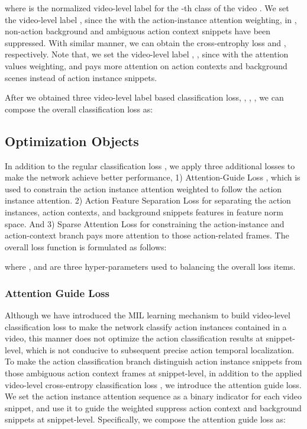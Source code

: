 \documentclass[journal,comsoc]{IEEEtran}
\begin{document}
where  is the normalized video-level label for the -th class of the video . We set the video-level label , since the with the action-instance attention weighting, in ,  non-action background and ambiguous action context snippets have been suppressed. With similar manner, we can obtain the cross-entrophy loss  and , respectively. Note that, we set the video-level label , , since with the attention values weighting,  and  pays more attention on action contexts and background scenes instead of action instance snippets. 

\par After we obtained three video-level label based classification loss, ,  ,  , we can compose the overall classification loss  as:




\subsection{Optimization Objects}
\label{sec:add_loss}

\par In addition to the regular classification loss , we apply three additional losses to make the network achieve better performance, 1) Attention-Guide Loss , which is used to constrain the action instance attention weighted  to follow the action instance attention. 2) Action Feature Separation Loss  for separating the action instances, action contexts, and background snippets features in feature norm space. And 3) Sparse Attention Loss  for constraining the action-instance and action-context branch pays more attention to those action-related frames. The overall loss function is formulated as follows:

where ,  and  are three hyper-parameters used to balancing the overall loss items.
\subsubsection{Attention Guide Loss} 
\par Although we have introduced the MIL learning mechanism to build video-level classification loss to make the network classify action instances contained in a video, this manner does not optimize the action classification results at snippet-level, which is not conducive to subsequent precise action temporal localization. To make the action classification branch distinguish action instance snippets from those ambiguous action context frames at snippet-level, in addition to the applied video-level cross-entropy classification loss , we introduce the attention guide loss. We set the action instance attention sequence  as a binary indicator for each video snippet, and use it to guide the weighted  suppress action context and background snippets at snippet-level. Specifically, we compose the attention guide loss  as:
\end{document}
